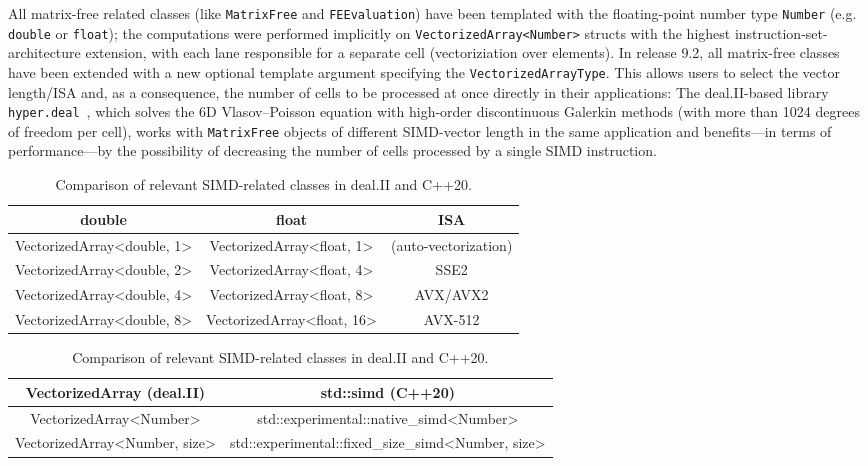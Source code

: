 \documentclass{ansarticle-preprint}
\begin{document}
All matrix-free related classes (like \texttt{MatrixFree} and \texttt{FEEvaluation}) 
have been templated with the floating-point number type \texttt{Number} (e.g. \texttt{double} or \texttt{float}); the computations were performed implicitly 
on \texttt{VectorizedArray<Number>} structs with the highest 
instruction-set-architecture extension, with each lane responsible for a separate 
cell (vectoriziation over elements). In release 9.2, all matrix-free classes 
have been extended with a new optional template argument specifying the 
\texttt{VectorizedArrayType}. This allows users to select the vector length/ISA and, 
as a consequence, the number of cells to be processed at once directly in their applications: 
The deal.II-based 
library \texttt{hyper.deal}~\cite{munch2020hyperdeal}, which solves the 6D Vlasov--Poisson equation with high-order 
discontinuous Galerkin methods (with more than 1024 degrees of freedom per cell), works with \texttt{MatrixFree} objects of different SIMD-vector 
length in the same application and benefits---in terms of performance---by the possibility of decreasing the number of cells processed by a single SIMD instruction.

\begin{table}
\caption{Supported vector lengths of the class \texttt{VectorizedArray} and 
the corresponding instruction-set-architecture extensions. }\label{tab:vectorizedarray}
\centering
\begin{tabular}{ccc}
\toprule
\textbf{double} & \textbf{float} & \textbf{ISA}\\
\midrule
VectorizedArray<double, 1> & VectorizedArray<float, 1> & (auto-vectorization) \\
VectorizedArray<double, 2> & VectorizedArray<float, 4> & SSE2 \\ 
VectorizedArray<double, 4> & VectorizedArray<float, 8> & AVX/AVX2 \\ 
VectorizedArray<double, 8> & VectorizedArray<float, 16> & AVX-512 \\ 
\bottomrule
\end{tabular}

\caption{Comparison of relevant SIMD-related classes in deal.II and C++20.}\label{tab:simd}
\centering
\begin{tabular}{cc}
\toprule
\textbf{VectorizedArray (deal.II)} & \textbf{std::simd (C++20)} \\
\midrule
VectorizedArray<Number> & std::experimental::native\_simd<Number> \\
VectorizedArray<Number, size> & std::experimental::fixed\_size\_simd<Number, size> \\ \bottomrule
\end{tabular}
\end{table}
\end{document}

